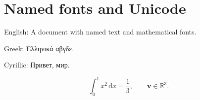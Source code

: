 \documentclass{article}
\begin{document}
\section{Named fonts and Unicode}
English: A document with named text and mathematical fonts.

Greek: Ελληνικά αβγδε.

Cyrillic: Привет, мир.

\[
  \int_0^1 x^2\,\mathrm{d}x = \frac{1}{3},
  \qquad \symbf{v} \in \mathbb{R}^3.
\]
\end{document}
